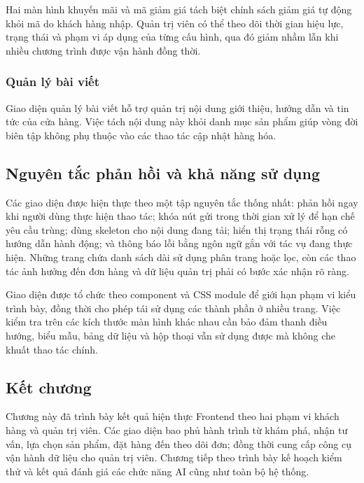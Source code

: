 Hai màn hình khuyến mãi và mã giảm giá tách biệt chính sách giảm giá tự động khỏi mã do khách hàng
nhập. Quản trị viên có thể theo dõi thời gian hiệu lực, trạng thái và phạm vi áp dụng của từng cấu
hình, qua đó giảm nhầm lẫn khi nhiều chương trình được vận hành đồng thời.



\subsubsection{Quản lý bài viết}

Giao diện quản lý bài viết hỗ trợ quản trị nội dung giới thiệu, hướng dẫn và tin tức của cửa hàng.
Việc tách nội dung này khỏi danh mục sản phẩm giúp vòng đời biên tập không phụ thuộc vào các thao
tác cập nhật hàng hóa.


\subsection{Nguyên tắc phản hồi và khả năng sử dụng}

Các giao diện được hiện thực theo một tập nguyên tắc thống nhất: phản hồi ngay khi người dùng thực
hiện thao tác; khóa nút gửi trong thời gian xử lý để hạn chế yêu cầu trùng; dùng skeleton cho nội dung
đang tải; hiển thị trạng thái rỗng có hướng dẫn hành động; và thông báo lỗi bằng ngôn ngữ gắn với tác
vụ đang thực hiện. Những trang chứa danh sách dài sử dụng phân trang hoặc lọc, còn các thao tác ảnh
hưởng đến đơn hàng và dữ liệu quản trị phải có bước xác nhận rõ ràng.

Giao diện được tổ chức theo component và CSS module để giới hạn phạm vi kiểu trình bày, đồng thời
cho phép tái sử dụng các thành phần ở nhiều trang. Việc kiểm tra trên các kích thước màn hình khác
nhau cần bảo đảm thanh điều hướng, biểu mẫu, bảng dữ liệu và hộp thoại vẫn sử dụng được mà không che
khuất thao tác chính.

\subsection*{Kết chương}

Chương này đã trình bày kết quả hiện thực Frontend theo hai phạm vi khách hàng và quản trị viên.
Các giao diện bao phủ hành trình từ khám phá, nhận tư vấn, lựa chọn sản phẩm, đặt hàng đến theo dõi
đơn; đồng thời cung cấp công cụ vận hành dữ liệu cho quản trị viên. Chương tiếp theo trình bày kế
hoạch kiểm thử và kết quả đánh giá các chức năng AI cũng như toàn bộ hệ thống.
